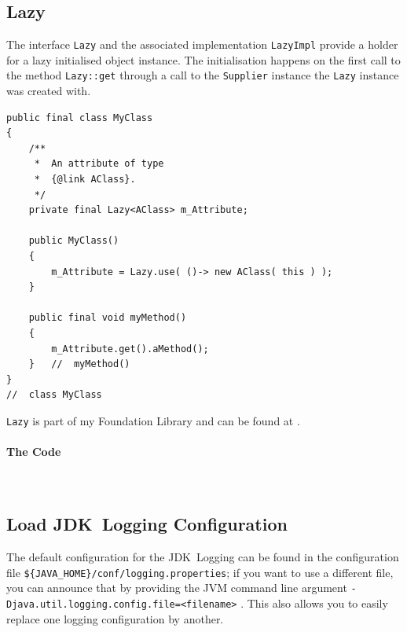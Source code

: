 \documentclass[11pt,a4paper, titlepage, parskip=half, headsepline, footsepline, cleardoublepage=current, headheight=1cm]{scrbook}
\begin{document}




\subsection{Lazy}\label{sec:Lazy}
The interface \lstinline|Lazy| and the associated implementation \lstinline|LazyImpl| provide a holder for a lazy initialised object instance. The initialisation happens on the first call to the method \lstinline|Lazy::get| through a call to the \lstinline|Supplier| instance the \lstinline|Lazy| instance was created with.

\begin{lstlisting}
public final class MyClass
{
    /**
     *  An attribute of type
     *  {@link AClass}.
     */
    private final Lazy<AClass> m_Attribute;
    
    public MyClass()
    {
        m_Attribute = Lazy.use( ()-> new AClass( this ) );
    }
    
    public final void myMethod()
    {
        m_Attribute.get().aMethod();
    }   //  myMethod()
}
//  class MyClass
\end{lstlisting}

\lstinline|Lazy| is part of my Foundation Library and can be found at \autocite{TQUADRAT_ORG_FOUNDATION_LAZY}.

\paragraph{The Code}\




\subsection{Load JDK~Logging Configuration}\label{sec:LoadJDKLoggingConfiguration}
The default configuration for the JDK~Logging can be found in the configuration file \verb#${JAVA_HOME}/conf/logging.properties#; if you want to use a different file, you can announce that by providing the JVM command line argument \verb#-Djava.util.logging.config.file=<filename># . This also allows you to easily replace one logging configuration by another.
\end{document}
